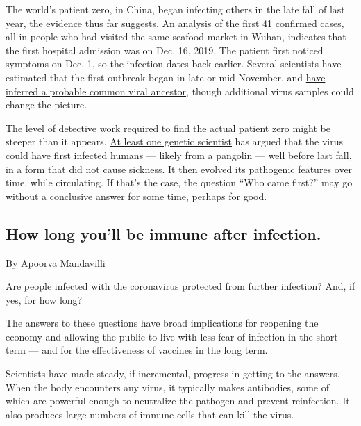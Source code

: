 The world's patient zero, in China, began infecting others in the late
fall of last year, the evidence thus far suggests.
\href{https://www.thelancet.com/journals/lancet/article/PIIS0140-6736(20)30183-5/fulltext?fbclid=IwAR18JG3cpHvWPVa9ZOZ9ZZnUS1hVjQJ0A2KcTcRAp0z9I12TbIv8rUC4sv0}{An
analysis of the first 41 confirmed cases,} all in people who had visited
the same seafood market in Wuhan, indicates that the first hospital
admission was on Dec. 16, 2019. The patient first noticed symptoms on
Dec. 1, so the infection dates back earlier. Several scientists have
estimated that the first outbreak began in late or mid-November, and
\href{http://virological.org/t/phylodynamic-analysis-176-genomes-6-mar-2020/356}{have
inferred a probable common viral ancestor}, though additional virus
samples could change the picture.

The level of detective work required to find the actual patient zero
might be steeper than it appears.
\href{https://news.tulane.edu/pr/study-coronavirus-pandemic-sparked-nature-not-bioengineering}{At
least one genetic scientist} has argued that the virus could have first
infected humans --- likely from a pangolin --- well before last fall, in
a form that did not cause sickness. It then evolved its pathogenic
features over time, while circulating. If that's the case, the question
``Who came first?'' may go without a conclusive answer for some time,
perhaps for good.

\hypertarget{how-long-youll-be-immune-after-infection}{%
\subsection{How long you'll be immune after
infection.}\label{how-long-youll-be-immune-after-infection}}

By Apoorva Mandavilli

Are people infected with the coronavirus protected from further
infection? And, if yes, for how long?

The answers to these questions have broad implications for reopening the
economy and allowing the public to live with less fear of infection in
the short term --- and for the effectiveness of vaccines in the long
term.

Scientists have made steady, if incremental, progress in getting to the
answers. When the body encounters any virus, it typically makes
antibodies, some of which are powerful enough to neutralize the pathogen
and prevent reinfection. It also produces large numbers of immune cells
that can kill the virus.

